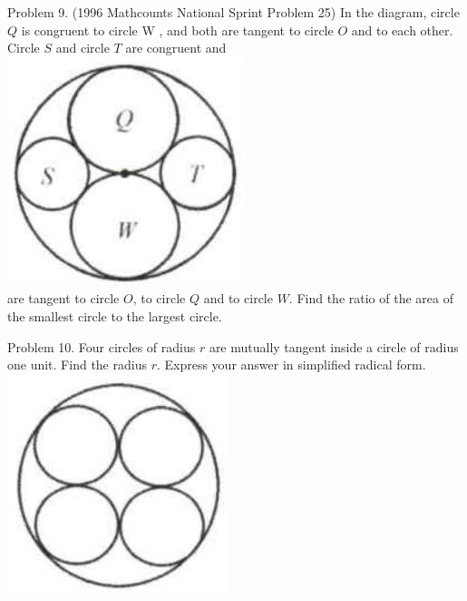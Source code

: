 \documentclass[10pt]{article}
\begin{document}
Problem 9. (1996 Mathcounts National Sprint Problem 25) In the diagram, circle \(Q\) is congruent to circle W , and both are tangent to circle \(O\) and to each other. Circle \(S\) and circle \(T\) are congruent and\\
\includegraphics[max width=\textwidth, center]{2025_04_17_97bc1f7e44d93c271a88g-185(4)}\\
are tangent to circle \(O\), to circle \(Q\) and to circle \(W\). Find the ratio of the area of the smallest circle to the largest circle.

Problem 10. Four circles of radius \(r\) are mutually tangent inside a circle of radius one unit. Find the radius \(r\). Express your answer in simplified radical form.\\
\includegraphics[max width=\textwidth, center]{2025_04_17_97bc1f7e44d93c271a88g-186}
\end{document}
